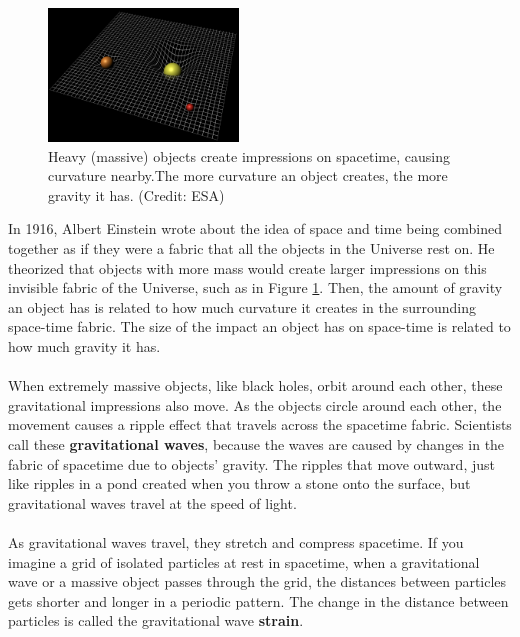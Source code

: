\documentclass[14pt]{article}
\begin{document}
\begin{figure}[h]
    \centering
    \includegraphics[width=0.45\textwidth]{spacetime.png}
    \caption{Heavy (massive) objects create impressions on spacetime, causing curvature nearby.The more curvature an object creates, the more gravity it has. (Credit: ESA)}
    \label{fig:spacetime}
\end{figure}


\noindent In 1916, Albert Einstein wrote about the idea of space and time being combined together as if they were a fabric that all the objects in the Universe rest on. He theorized that objects with more mass would create larger impressions on this invisible fabric of the Universe, such as in Figure \ref{fig:spacetime}. Then, the amount of gravity an object has is related to how much curvature it creates in the surrounding space-time fabric. The size of the impact an object has on space-time is related to how much gravity it has.
\\\\
\noindent When extremely massive objects, like black holes, orbit around each other, these gravitational impressions also move. As the objects circle around each other, the movement causes a ripple effect that travels across the spacetime fabric. Scientists call these \textbf{gravitational waves}, because the waves are caused by changes in the fabric of spacetime due to objects' gravity. The ripples that move outward, just like ripples in a pond created when you throw a stone onto the surface, but gravitational waves travel at the speed of light.
\\\\
As gravitational waves travel, they stretch and compress spacetime. If you imagine a grid of isolated particles at rest in spacetime, when a gravitational wave or a massive object passes through the grid, the distances between particles gets shorter and longer in a periodic pattern. The change in the distance between particles is called the gravitational wave \textbf{strain}.
\end{document}
